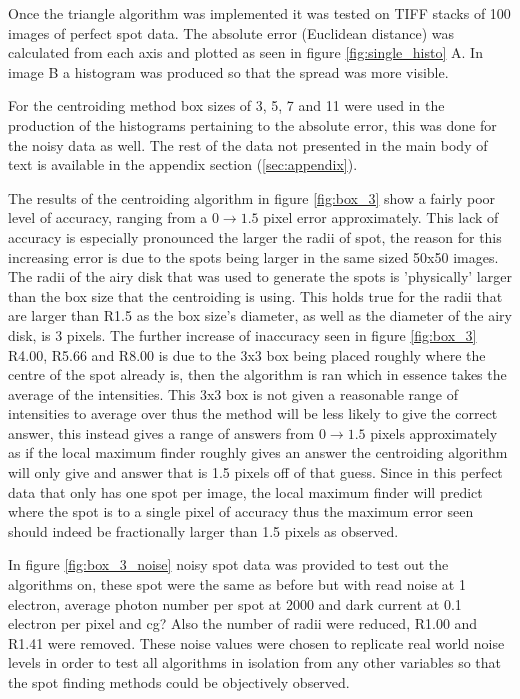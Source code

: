        Once the triangle algorithm was implemented it was tested on TIFF stacks of 100 images 
    of perfect spot data. The absolute error (Euclidean distance) was calculated from each 
    axis and plotted as seen in figure \ref{fig:single_histo} A. In image B a histogram 
    was produced so that the spread was more visible.

   For the centroiding method box sizes of 3, 5, 7 and 11 were used in the production 
  of the histograms pertaining to the absolute error, this was done for the noisy data as 
  well. The rest of the data not presented in the main body of text is available in the appendix 
  section (\ref{sec:appendix}).

 The results of the centroiding algorithm in figure \ref{fig:box_3} show a fairly poor 
  level of accuracy, ranging from a $0\rightarrow 1.5$ pixel error approximately. This lack of accuracy 
  is especially pronounced the larger the radii of spot, the reason for this increasing 
  error is due to the spots being larger in the same sized 50x50 images. The radii of the 
  airy disk that was used to generate the spots is 'physically' larger than the box size 
  that the centroiding is using. This holds true for the radii that are larger than R1.5 
  as the box size's diameter, as well as the diameter of the airy disk, is 3 pixels. The further 
  increase of inaccuracy seen in figure \ref{fig:box_3} R4.00, R5.66 and R8.00 is due to the 
  3x3 box being placed roughly where the centre of the spot already is, then the algorithm is 
  ran which in essence takes the average of the intensities. This 3x3 box is not given a reasonable 
  range of intensities to average over thus the method will be less likely to give the correct answer,
  this instead gives a range of answers from $0\rightarrow 1.5$ pixels approximately as if the 
  local maximum finder roughly gives an answer the centroiding algorithm will only give and answer 
  that is 1.5 pixels off of that guess. Since in this perfect data that only has one spot per image, the 
  local maximum finder will predict where the spot is to a single pixel of accuracy thus the maximum 
  error seen should indeed be fractionally larger than 1.5 pixels as observed.

  In figure \ref{fig:box_3_noise} noisy spot data was provided to test out the algorithms on, 
  these spot were the same as before but with read noise at 1 electron, average photon number 
  per spot at 2000 and dark current at 0.1 electron per pixel and cg? Also the number of radii 
  were reduced, R1.00 and R1.41 were removed. These noise values were chosen 
  to replicate real world noise levels in order to test all algorithms in isolation from any other 
  variables so that the spot finding methods could be objectively observed. 


